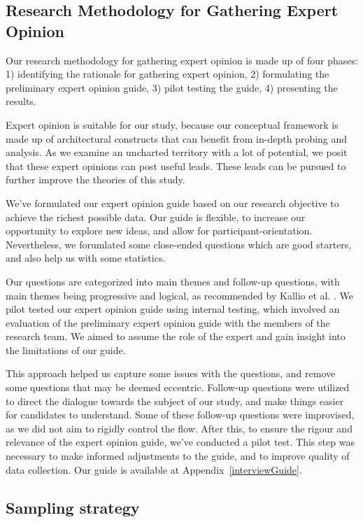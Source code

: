 \documentclass{bmcart}
\begin{document}
\subsection{Research Methodology for Gathering Expert Opinion}
Our research methodology for gathering expert opinion is made up of four phases: 1) identifying the rationale for gathering expert opinion, 2) formulating the preliminary expert opinion guide, 3) pilot testing the guide, 4) presenting the results. 

Expert opinion is suitable for our study, because our conceptual framework is made up of architectural constructs that can benefit from in-depth probing and analysis. As we examine an uncharted territory with a lot of potential, we posit that these expert opinions can post useful leads. These leads can be pursued to further improve the theories of this study.

We've formulated our expert opinion guide based on our research objective to achieve the richest possible data. Our guide is flexible, to increase our opportunity to explore new ideas, and allow for participant-orientation. Nevertheless, we forumlated some close-ended questions which are good starters, and also help us with some statistics. 

Our questions are categorized into main themes and follow-up questions, with main themes being progressive and logical, as recommended by Kallio et al. \cite{kallio2016systematic}. We pilot tested our expert opinion guide using internal testing, which involved an evaluation of the preliminary expert opinion guide with the members of the research team. We aimed to assume the role of the expert and gain insight into the limitations of our guide.

This approach helped us capture some issues with the questions, and remove some questions that may be deemed eccentric. Follow-up questions were utilized to direct the dialogue towards the subject of our study, and make things easier for candidates to understand. Some of these follow-up questions were improvised, as we did not aim to rigidly control the flow. After this, to ensure the rigour and relevance of the expert opinion guide, we've conducted a pilot test. This step was necessary to make informed adjustments to the guide, and to improve quality of data collection. Our guide is available at Appendix~\ref{interviewGuide}.


\subsection{Sampling strategy}
\end{document}
